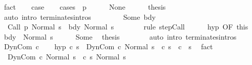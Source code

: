 \begin{isabellebody}
\ fact\isanewline
\ \ \isamarkupfalse%
\ {\isacharquery}case\isanewline
\ \ \isamarkupfalse%
\ {\isacharparenleft}cases\ {\isachardoublequoteopen}{\isasymGamma}\ p{\isachardoublequoteclose}{\isacharparenright}\isanewline
\ \ \ \ \isamarkupfalse%
\ None\isanewline
\ \ \ \ \isamarkupfalse%
\ {\isacharquery}thesis\isanewline
\ \ \ \ \ \ \isamarkupfalse%
\ {\isacharparenleft}auto\ intro{\isacharcolon}\ terminates{\isachardot}intros{\isacharparenright}\isanewline
\ \ \isamarkupfalse%
\isanewline
\ \ \ \ \isamarkupfalse%
\ {\isacharparenleft}Some\ bdy{\isacharparenright}\isanewline
\ \ \ \ \isamarkupfalse%
\ \isamarkupfalse%
\ {\isachardoublequoteopen}{\isasymGamma}{\isasymturnstile}\ {\isacharparenleft}Call\ p{\isacharcomma}\ Normal\ s{\isacharparenright}\ {\isasymrightarrow}\ {\isacharparenleft}bdy{\isacharcomma}\ Normal\ s{\isacharparenright}{\isachardoublequoteclose}\isanewline
\ \ \ \ \ \ \isamarkupfalse%
\ {\isacharparenleft}rule\ step{\isachardot}Call{\isacharparenright}\isanewline
\ \ \ \ \isamarkupfalse%
\ hyp\ {\isacharbrackleft}OF\ this{\isacharbrackright}\ \isamarkupfalse%
\ {\isachardoublequoteopen}{\isasymGamma}{\isasymturnstile}bdy\ {\isasymdown}\ Normal\ s{\isachardoublequoteclose}\isacommand{{\isachardot}}\isamarkupfalse%
\isanewline
\ \ \ \ \isamarkupfalse%
\ Some\ \isamarkupfalse%
\ {\isacharquery}thesis\isanewline
\ \ \ \ \ \ \isamarkupfalse%
\ {\isacharparenleft}auto\ intro{\isacharcolon}\ terminates{\isachardot}intros{\isacharparenright}\isanewline
\ \ \isamarkupfalse%
\isanewline
{}\isamarkupfalse%
\isanewline
\ \ \isamarkupfalse%
\ {\isacharparenleft}DynCom\ c{\isacharparenright}\isanewline
\ \ \isamarkupfalse%
\ hyp{\isacharcolon}\ {\isachardoublequoteopen}{\isasymAnd}c{\isacharprime}\ s{\isacharprime}{\isachardot}\ {\isasymGamma}{\isasymturnstile}\ {\isacharparenleft}DynCom\ c{\isacharcomma}\ Normal\ s{\isacharparenright}\ {\isasymrightarrow}\ {\isacharparenleft}c{\isacharprime}{\isacharcomma}\ s{\isacharprime}{\isacharparenright}\ {\isasymLongrightarrow}\ {\isasymGamma}{\isasymturnstile}c{\isacharprime}\ {\isasymdown}\ s{\isacharprime}{\isachardoublequoteclose}\ \isamarkupfalse%
\ fact\isanewline
\ \ \isamarkupfalse%
\ {\isachardoublequoteopen}{\isasymGamma}{\isasymturnstile}\ {\isacharparenleft}DynCom\ c{\isacharcomma}\ Normal\ s{\isacharparenright}\ {\isasymrightarrow}\ {\isacharparenleft}c\ s{\isacharcomma}\ Normal\ s{\isacharparenright}{\isachardoublequoteclose}\isanewline

\end{isabellebody}
